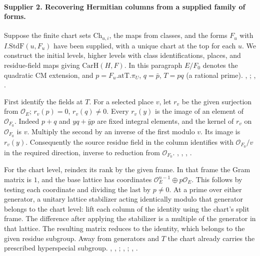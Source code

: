 \paragraph{Supplier 2. Recovering Hermitian columns from a supplied family of forms.}
Suppose the finite chart sets $\mathrm{Ch}_{u,i}$, the maps from classes,
and the forms $F_u$ with $I.\mathrm{StdF}(u,F_u)$ have been supplied,
with a unique chart at the top for each $u$. We construct the initial
levels, higher levels with class identifications, places, and residue-field
maps giving $\mathrm{CarH}(H,F)$. In this paragraph $E/F_0$ denotes the
quadratic CM extension, and $p=F_u.\mathrm{atT}.\pi_U$, $q=\bar p$,
$T=pq$ (a rational prime). ,
;
, .

First identify the fields at $T$. For a selected place $v$, let $r_v$ be
the given surjection from $\mathcal O_E$; $r_v(p)=0$, $r_v(q)\ne0$.
Every $r_v(y)$ is the image of an element of $\mathcal O_{F_0}$. Indeed $p+q$ and
$yq+\bar y p$ are fixed integral elements, and the kernel of $r_v$ on
$\mathcal O_{F_0}$ is $v$. Multiply the second by an inverse of the first
modulo $v$. Its image is $r_v(y)$. Consequently the source residue field
in the column identifies with $\mathcal O_{F_0}/v$ in the required
direction, inverse to reduction from $\mathcal O_{F_0}$.
, , ,
.

For the chart level, reindex its rank by the given frame. In that frame the
Gram matrix is $1$, and the base lattice has coordinates
$\mathcal O_E^{n-1}\oplus p\mathcal O_E$. This follows by testing each
coordinate and dividing the last by $p\ne0$. At a prime over either
generator, a unitary lattice stabilizer acting identically modulo that
generator belongs to the chart level: lift each column of the identity
using the chart's split frame. The difference after applying the
stabilizer is a multiple of the generator in that lattice. The resulting
matrix reduces to the identity, which belongs to the given residue
subgroup. Away from generators and $T$ the chart already carries the
prescribed hyperspecial subgroup.
, ,
;
, ;
, .

